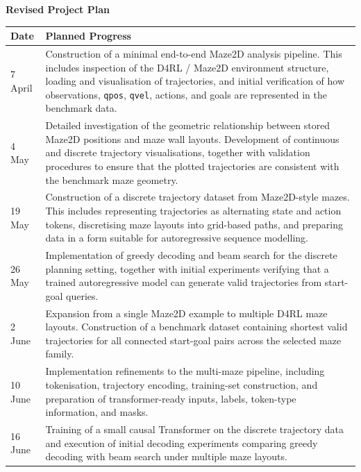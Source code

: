 \documentclass[12pt]{article}
\begin{document}
\vspace{1em}
\noindent\textbf{Revised Project Plan}

\begin{longtable}{|p{3cm}|p{11cm}|}
\hline
\textbf{Date} & \textbf{Planned Progress} \\
\hline

7 April &
Construction of a minimal end-to-end Maze2D analysis pipeline. This includes inspection of the D4RL / Maze2D environment structure, loading and visualisation of trajectories, and initial verification of how observations, \texttt{qpos}, \texttt{qvel}, actions, and goals are represented in the benchmark data. \\
\hline

4 May &
Detailed investigation of the geometric relationship between stored Maze2D positions and maze wall layouts. Development of continuous and discrete trajectory visualisations, together with validation procedures to ensure that the plotted trajectories are consistent with the benchmark maze geometry. \\
\hline

19 May &
Construction of a discrete trajectory dataset from Maze2D-style mazes. This includes representing trajectories as alternating state and action tokens, discretising maze layouts into grid-based paths, and preparing data in a form suitable for autoregressive sequence modelling. \\
\hline

26 May &
Implementation of greedy decoding and beam search for the discrete planning setting, together with initial experiments verifying that a trained autoregressive model can generate valid trajectories from start-goal queries. \\
\hline

2 June &
Expansion from a single Maze2D example to multiple D4RL maze layouts. Construction of a benchmark dataset containing shortest valid trajectories for all connected start-goal pairs across the selected maze family. \\
\hline

10 June &
Implementation refinements to the multi-maze pipeline, including tokenisation, trajectory encoding, training-set construction, and preparation of transformer-ready inputs, labels, token-type information, and masks. \\
\hline

16 June &
Training of a small causal Transformer on the discrete trajectory data and execution of initial decoding experiments comparing greedy decoding with beam search under multiple maze layouts. \\
\hline


\end{longtable}
\end{document}
